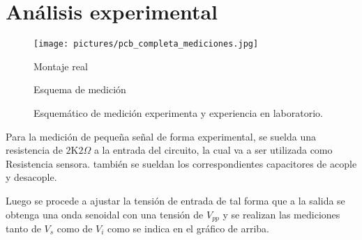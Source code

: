   \section{Análisis experimental}
    \begin{figure}[H]
      \centering
      \begin{minipage}[t]{0.35\textwidth}
        \centering
        \texttt{[image: pictures/pcb\_completa\_mediciones.jpg]}
        \caption*{Montaje real}
      \end{minipage}\hfill
      \begin{minipage}[t]{0.59\textwidth}
        \centering
        \caption*{Esquema de medición}
      \end{minipage}
      \caption{Esquemático de medición experimenta y experiencia en laboratorio.}
      \label{fig:foto-tikz-inline}
    \end{figure}

    Para la medición de pequeña señal de forma experimental, se suelda una resistencia de $2\text{K}2\Omega$ a la entrada
    del circuito, la cual va a ser utilizada como Resistencia sensora. también se sueldan los correspondientes capacitores
    de acople y desacople.

    Luego se procede a ajustar la tensión de entrada de tal forma que a la salida se obtenga una onda senoidal con una
    tensión de $V_{pp}$ y se realizan las mediciones tanto de $V_s$ como de $V_i$ como se indica en el gráfico de
    arriba.

